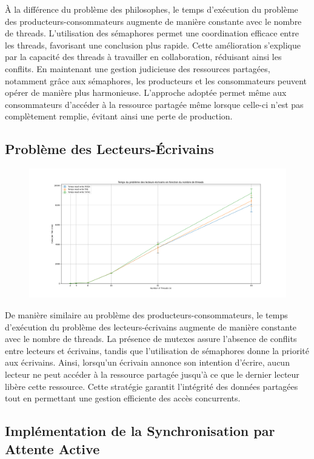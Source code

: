 \documentclass[12pt,titlepage]{article}
\begin{document}
À la différence du problème des philosophes, le temps d'exécution du problème des producteurs-consommateurs augmente de manière constante avec le nombre de threads. L'utilisation des sémaphores permet une coordination efficace entre les threads, favorisant une conclusion plus rapide. Cette amélioration s'explique par la capacité des threads à travailler en collaboration, réduisant ainsi les conflits. En maintenant une gestion judicieuse des ressources partagées, notamment grâce aux sémaphores, les producteurs et les consommateurs peuvent opérer de manière plus harmonieuse. L'approche adoptée permet même aux consommateurs d'accéder à la ressource partagée même lorsque celle-ci n'est pas complètement remplie, évitant ainsi une perte de production.

\subsection{Problème des Lecteurs-Écrivains}

\begin{figure}[H]
\includegraphics[width=\textwidth, keepaspectratio]{Temps_read_write.png}
\centering
\end{figure}

De manière similaire au problème des producteurs-consommateurs, le temps d'exécution du problème des lecteurs-écrivains augmente de manière constante avec le nombre de threads. La présence de mutexes assure l'absence de conflits entre lecteurs et écrivains, tandis que l'utilisation de sémaphores donne la priorité aux écrivains. Ainsi, lorsqu'un écrivain annonce son intention d'écrire, aucun lecteur ne peut accéder à la ressource partagée jusqu'à ce que le dernier lecteur libère cette ressource. Cette stratégie garantit l'intégrité des données partagées tout en permettant une gestion efficiente des accès concurrents.

\subsection{Implémentation de la Synchronisation par Attente Active}
\label{l'implémentation de la synchronisation par attente active}
\end{document}
